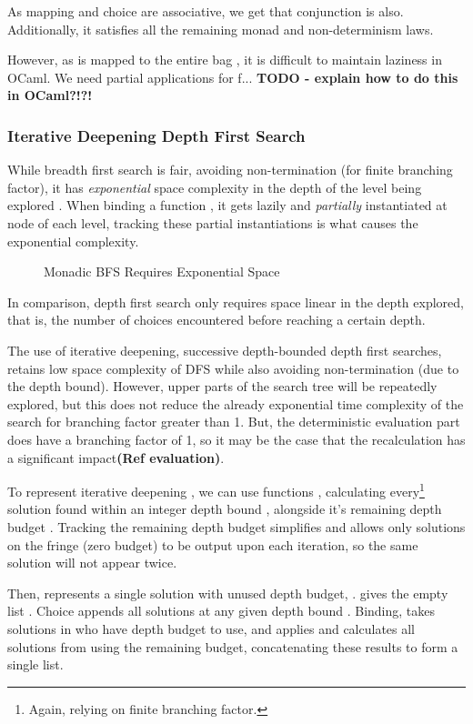 As mapping and choice are associative, we get that conjunction is also. Additionally, it satisfies all the remaining monad and non-determinism laws. 

However, as  is mapped to the entire bag , it is difficult to maintain laziness in OCaml. We need partial applications for f... \textbf{TODO - explain how to do this in OCaml?!?!}

\subsubsection{Iterative Deepening Depth First Search}
While breadth first search is fair, avoiding non-termination (for finite branching factor), it has \textit{exponential} space complexity in the depth of the level being explored \cite{NorvigAI}. When binding a function , it gets lazily and \textit{partially} instantiated at node of each level, tracking these partial instantiations is what causes the exponential complexity.

\begin{figure}

\caption{Monadic BFS Requires Exponential Space}
\end{figure}

In comparison, depth first search only requires space linear in the depth explored, that is, the number of choices encountered before reaching a certain depth.

The use of iterative deepening, successive depth-bounded depth first searches, retains low space complexity of DFS while also avoiding non-termination (due to the depth bound). However, upper parts of the search tree will be repeatedly explored, but this does not reduce the already exponential time complexity of the search for branching factor greater than 1. But, the deterministic evaluation part does have a branching factor of 1, so it may be the case that the recalculation has a significant impact\textbf{(Ref evaluation)}. 

To represent iterative deepening \cite{SearchAlgebra}, we can use functions , calculating every\footnote{Again, relying on finite branching factor.} solution found within an integer depth bound , alongside it's remaining depth budget . Tracking the remaining depth budget simplifies  and allows only solutions on the fringe (zero budget) to be output upon each iteration, so the same solution will not appear twice.

Then,  represents a single solution with unused depth budget, .  gives the empty list . Choice appends all solutions at any given depth bound . Binding,  takes solutions in  who have depth budget to use, and applies  and calculates all solutions from  using the remaining budget, concatenating these results to form a single list.

